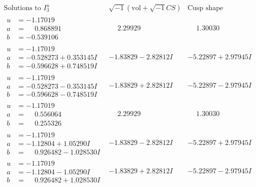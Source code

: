 \documentclass[1p]{elsarticle_modified}
\theoremstyle{definition}
\newcommand{\I}{\sqrt{-1}}
\begin{document}
$$\begin{array}{c|c|c}  
\text{Solutions to }I^u_{3}& \I (\text{vol} + \sqrt{-1}CS) & \text{Cusp shape}\\
 \hline 
\begin{aligned}
u &= -1.17019\phantom{ +0.000000I} \\
a &= \phantom{-}0.868891\phantom{ +0.000000I} \\
b &= -0.539106\phantom{ +0.000000I}\end{aligned}
 & \phantom{-}2.29929\phantom{ +0.000000I} & \phantom{-}1.30030\phantom{ +0.000000I} \\ \hline\begin{aligned}
u &= -1.17019\phantom{ +0.000000I} \\
a &= -0.528273 + 0.353145 I \\
b &= -0.596628 + 0.748519 I\end{aligned}
 & -1.83829 - 2.82812 I & -5.22897 + 2.97945 I \\ \hline\begin{aligned}
u &= -1.17019\phantom{ +0.000000I} \\
a &= -0.528273 - 0.353145 I \\
b &= -0.596628 - 0.748519 I\end{aligned}
 & -1.83829 + 2.82812 I & -5.22897 - 2.97945 I \\ \hline\begin{aligned}
u &= -1.17019\phantom{ +0.000000I} \\
a &= \phantom{-}0.556064\phantom{ +0.000000I} \\
b &= \phantom{-}0.255326\phantom{ +0.000000I}\end{aligned}
 & \phantom{-}2.29929\phantom{ +0.000000I} & \phantom{-}1.30030\phantom{ +0.000000I} \\ \hline\begin{aligned}
u &= -1.17019\phantom{ +0.000000I} \\
a &= -1.12804 + 1.05290 I \\
b &= \phantom{-}0.926482 - 1.028530 I\end{aligned}
 & -1.83829 - 2.82812 I & -5.22897 + 2.97945 I \\ \hline\begin{aligned}
u &= -1.17019\phantom{ +0.000000I} \\
a &= -1.12804 - 1.05290 I \\
b &= \phantom{-}0.926482 + 1.028530 I\end{aligned}
 & -1.83829 + 2.82812 I & -5.22897 - 2.97945 I \\ \hline\begin{aligned}

\end{aligned}
\end{array}$$
\end{document}
